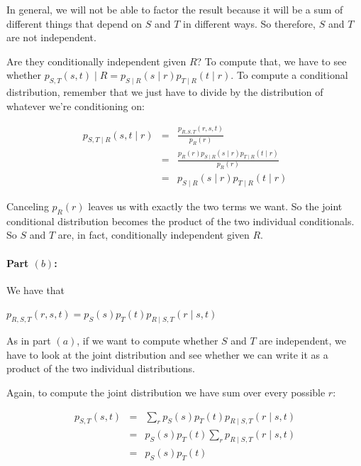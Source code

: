 \documentclass[6008notes.tex]{subfiles}
\begin{document}
In general, we will not be able to factor the result because it will be a sum of different things that depend on $S$ and $T$ in different ways. So therefore, $S$ and $T$ are not independent. 

Are they conditionally independent given $R$? To compute that, we have to see whether $p_{S,T}(s,t) \mid R = p_{S \mid R}(s \mid r)  p_{T \mid R}(t \mid r)$. To compute a conditional distribution, remember that we just have to divide by the distribution of whatever we're conditioning on:

\begin{eqnarray*}
p_{S,T \mid R}(s,t \mid r) &=& \frac{p_{R,S,T}(r,s,t)}{p_R(r)} \\
             &=& \frac{p_R(r) p_{S \mid R}(s \mid r)  p_{T \mid R}(t \mid r)}{p_R(r)} \\
						 &=& p_{S \mid R}(s \mid r)  p_{T \mid R}(t \mid r)
\end{eqnarray*}

Canceling $p_R(r)$ leaves us with exactly the two terms we want. So the joint conditional distribution  becomes the product of the two individual conditionals. So $S$ and $T$ are, in fact, conditionally independent given $R$.

\paragraph{Part $(b)$:}  We have that 

{\centering$p_{R,S,T}(r,s,t) = p_S(s) p_T(t) p_{R \mid S,T}(r \mid s,t)$ \par}


As in part $(a)$, if we want to compute whether $S$ and $T$ are independent, we have to look at the joint distribution and see whether we can write it as a product of the two individual distributions. 

Again, to compute the joint distribution we have sum over every possible $r$:

\begin{eqnarray*}
p_{S,T}(s,t) &=& \sum_r p_S(s) p_T(t) p_{R \mid S,T}(r \mid s,t) \\
             &=& p_S(s) p_T(t) \sum_r p_{R \mid S,T}(r \mid s,t) \\
						 &=& p_S(s) p_T(t)
\end{eqnarray*}
\end{document}
